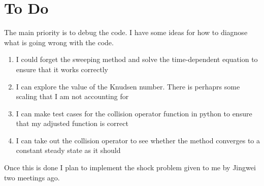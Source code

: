 \documentclass{article}
\begin{document}
\section{To Do}
The main priority is to debug the code. I have some ideas for how to diagnose what is going wrong with the code.
\begin{enumerate}
    \item I could forget the sweeping method and solve the time-dependent equation to ensure that it works correctly
    \item I can explore the value of the Knudsen number. There is perhaprs some scaling that I am not accounting for
    \item I can make test cases for the collision operator function in python to ensure that my adjusted function is correct
    \item I can take out the collision operator to see whether the method converges to a constant steady state as it should 
\end{enumerate}
Once this is done I plan to implement the shock problem given to me by Jingwei two meetings ago.


\end{document}
